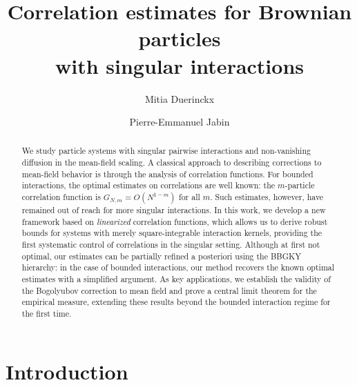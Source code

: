 \documentclass[a4paper,11pt,reqno,noindent]{amsart}
\title[Correlation estimates for singular interactions]{Correlation estimates for Brownian particles\\with singular interactions}
\author[M.~Duerinckx]{Mitia Duerinckx}
\author[P.-E. Jabin]{Pierre-Emmanuel Jabin}
\theoremstyle{plain}
\theoremstyle{definition}
\numberwithin{equation}{section}
\begin{document}
\begin{abstract}
We study particle systems with singular pairwise interactions and non-vanishing diffusion in the mean-field scaling. A classical approach to describing corrections to mean-field behavior is through the analysis of correlation functions. For bounded interactions, the optimal estimates on correlations are well known: the $m$-particle correlation function is $G_{N,m}=O(N^{1-m})$ for all $m$. Such estimates, however, have remained out of reach for more singular interactions. In this work, we develop a new framework based on {\it linearized} correlation functions, which allows us to derive robust bounds for systems with merely square-integrable interaction kernels, providing the first systematic control of correlations in the singular setting. Although at first not optimal, our estimates can be partially refined a posteriori using the BBGKY hierarchy: in the case of bounded interactions, our method recovers the known optimal estimates with a simplified argument. As key applications, we establish the validity of the Bogolyubov correction to mean field and prove a central limit theorem for the empirical measure, extending these results beyond the bounded interaction regime for the first time.
\end{abstract}

\maketitle
\setcounter{tocdepth}{1}
\tableofcontents
\allowdisplaybreaks

\section{Introduction}
\end{document}
